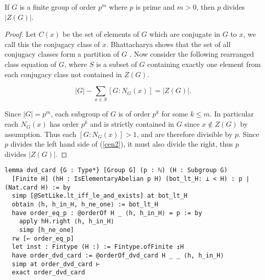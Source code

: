 \begin{lemma}
  \label{IsElementaryAbelian.dvd_card}
  \leanok
If $G$ is a finite group of order $p^m$ where $p$ is prime and $m > 0$, then $p$ divides $|Z(G)|$. 
\end{lemma}
\begin{proof}
Let $C(x)$ be the set of elements of $G$ which are conjugate in $G$ to $x$, we call this the conjugacy class of $x$. Bhattacharya shows that the set of all conjugacy classes form a partition of $G$ \cite[p.112]{bhattacharya}. Now consider the following rearranged class equation of $G$, where $S$ is a subset of $G$ containing exactly one element from each conjugacy class not contained in $Z(G)$. 
 
\begin{equation} \label{cen2}
|G| - \sum_{x \in S} [G:N_G(x)] = |Z(G)|.
\end{equation}

Since $|G| = p^m$, each subgroup of $G$ is of order $p^k$ for some $k \leq m$. In particular each $N_G(x)$ has order $p^k$ and is strictly contained in $G$ since $x \not \in Z(G)$ by assumption. Thus each $[G:N_G(x)] > 1$, and are therefore divisible by $p$. Since $p$ divides the left hand side of (\ref{cen2}), it must also divide the right, thus $p$ divides $|Z(G)|$. 

\end{proof}
\begin{footnotesize}
\begin{verbatim}
lemma dvd_card {G : Type*} [Group G] (p : ℕ) (H : Subgroup G)
  [Finite H] (hH : IsElementaryAbelian p H) (bot_lt_H: ⊥ < H) : p ∣ (Nat.card H) := by
  simp [@SetLike.lt_iff_le_and_exists] at bot_lt_H
  obtain ⟨h, h_in_H, h_ne_one⟩ := bot_lt_H
  have order_eq_p : @orderOf H _ ⟨h, h_in_H⟩ = p := by
    apply hH.right ⟨h, h_in_H⟩
    simp [h_ne_one]
  rw [← order_eq_p]
  let inst : Fintype (H :) := Fintype.ofFinite ↥H
  have order_dvd_card := @orderOf_dvd_card H _ _ ⟨h, h_in_H⟩
  simp at order_dvd_card ⊢
  exact order_dvd_card
\end{verbatim}
\end{footnotesize}

